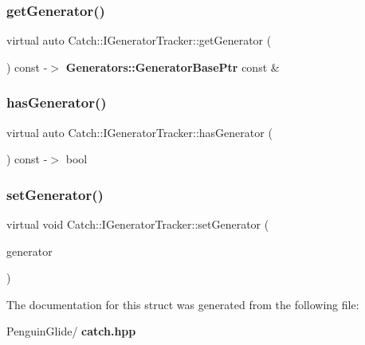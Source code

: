 \subsubsection{getGenerator()}
{\footnotesize\ttfamily virtual auto Catch\+::\+I\+Generator\+Tracker\+::get\+Generator (\begin{DoxyParamCaption}{ }\end{DoxyParamCaption}) const -\/$>$  \textbf{ Generators\+::\+Generator\+Base\+Ptr} const \&\hspace{0.3cm}{\ttfamily [pure virtual]}}

\mbox{\label{struct_catch_1_1_i_generator_tracker_ae88084f9af27c8b9a5d5775b9c148498}} 
\subsubsection{hasGenerator()}
{\footnotesize\ttfamily virtual auto Catch\+::\+I\+Generator\+Tracker\+::has\+Generator (\begin{DoxyParamCaption}{ }\end{DoxyParamCaption}) const -\/$>$  bool\hspace{0.3cm}{\ttfamily [pure virtual]}}

\mbox{\label{struct_catch_1_1_i_generator_tracker_a9945eff42219edc5a7071eebd8b0419e}} 
\subsubsection{setGenerator()}
{\footnotesize\ttfamily virtual void Catch\+::\+I\+Generator\+Tracker\+::set\+Generator (\begin{DoxyParamCaption}\item[{\textbf{ Generators\+::\+Generator\+Base\+Ptr} \&\&}]{generator }\end{DoxyParamCaption})\hspace{0.3cm}{\ttfamily [pure virtual]}}



The documentation for this struct was generated from the following file\+:\begin{DoxyCompactItemize}
\item 
Penguin\+Glide/\textbf{ catch.\+hpp}\end{DoxyCompactItemize}
